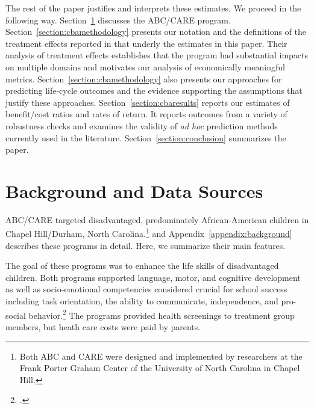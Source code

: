The rest of the paper justifies and interprets these estimates. We proceed in the following way. Section~\ref{section:background} discusses the ABC/CARE program. Section~\ref{section:cbamethodology} presents our notation and the definitions of the treatment effects reported in \cite{Garcia_Heckman_Ziff_2017_Gender-Diff_UNPUBLISHED} that underly the estimates in this paper. Their analysis of treatment effects establishes that the program had substantial impacts on multiple domains and motivates our analysis of economically meaningful metrics.  Section~\ref{section:cbamethodology} also presents our approaches for predicting life-cycle outcomes and the evidence supporting the assumptions that justify these approaches. Section~\ref{section:cbaresults} reports our estimates of benefit/cost ratios and rates of return. It reports outcomes from a variety of robustness checks and examines the validity of \emph{ad hoc} prediction methods currently used in the literature. Section~\ref{section:conclusion} summarizes the paper.

\section[Background and Data Sources]{Background and Data Sources} \label{section:background}

ABC/CARE targeted disadvantaged, predominately African-American children in Chapel Hill/Durham, North Carolina.\footnote{Both ABC and CARE were designed and implemented by researchers at the Frank Porter Graham Center of the University of North Carolina in Chapel Hill.} \cite{Garcia_Heckman_Ziff_2017_Gender-Diff_UNPUBLISHED} and  Appendix~\ref{appendix:background} describes these programs in detail. Here, we summarize their main features.

The goal of these programs was to enhance the life skills of disadvantaged children. Both programs supported language, motor, and cognitive development as well as socio-emotional competencies considered crucial for school success including task orientation, the ability to communicate, independence, and pro-social behavior.\footnote{\citet{Sparling_1974_Synth_Edu_Infant_SPEECH, Ramey_Collier_etal_1976_CarolinaAbecedarianProject, Ramey_etal_1985_Project-CARE_TiECSE, Wasik_Ramey_etal_1990_CD, Ramey-etal_2012-ABC}.} The programs provided health screenings to treatment group members, but heath care costs were paid by parents.

